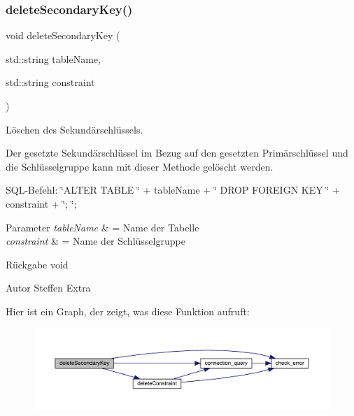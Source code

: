 \subsubsection{delete\+Secondary\+Key()}
{\footnotesize\ttfamily void delete\+Secondary\+Key (\begin{DoxyParamCaption}\item[{std\+::string}]{table\+Name,  }\item[{std\+::string}]{constraint }\end{DoxyParamCaption})}



Löschen des Sekundärschlüssels. 

Der gesetzte Sekundärschlüssel im Bezug auf den gesetzten Primärschlüssel und die Schlüsselgruppe kann mit dieser Methode gelöscht werden.~\newline


S\+Q\+L-\/\+Befehl\+: \char`\"{}\+A\+L\+T\+E\+R T\+A\+B\+L\+E \char`\"{} + table\+Name + \char`\"{} D\+R\+O\+P F\+O\+R\+E\+I\+G\+N K\+E\+Y \char`\"{} + constraint + \char`\"{}; \char`\"{};


\begin{DoxyParams}{Parameter}
{\em table\+Name} & = Name der Tabelle \\
\hline
{\em constraint} & = Name der Schlüsselgruppe\\
\hline
\end{DoxyParams}
\begin{DoxyReturn}{Rückgabe}
void
\end{DoxyReturn}
\begin{DoxyAuthor}{Autor}
Steffen Extra 
\end{DoxyAuthor}
Hier ist ein Graph, der zeigt, was diese Funktion aufruft\+:\nopagebreak
\begin{figure}[H]
\begin{center}
\leavevmode
\includegraphics[width=350pt]{tables_8hpp_aee892818f06208ce4b68fb7598a7494c_cgraph}
\end{center}
\end{figure}
\mbox{\label{tables_8hpp_a9754762b2c19711bf3dcbfceca61d97d}} 
